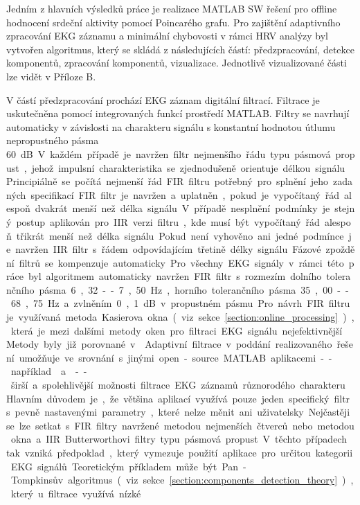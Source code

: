 Jedním z hlavních výsledků práce je realizace MATLAB SW řešení pro offline
hodnocení srdeční aktivity pomocí Poincarého grafu. Pro zajištění adaptivního
zpracování EKG záznamu a minimální chybovosti v rámci HRV analýzy byl vytvořen
algoritmus, který se skládá z následujících částí: předzpracování, detekce
komponentů, zpracování komponentů, vizualizace. Jednotlivě vizualizované části
lze vidět v Příloze B.

V částí předzpracování prochází EKG záznam digitální filtrací. Filtrace je
uskutečněna pomocí integrovaných funkcí prostředí MATLAB. Filtry se
navrhují automaticky v závislosti na charakteru signálu s konstantní hodnotou
útlumu nepropustného pásma 60~\si\dB. V každém případě je navržen filtr
nejmenšího řádu typu pásmová propust, jehož impulsní charakteristika se
zjednodušeně orientuje délkou signálu. Principiálně se počítá nejmenší řád FIR
filtru potřebný pro splnění jeho zadaných specifikací. FIR filtr je navržen a
uplatněn, pokud je vypočítaný řád alespoň dvakrát menší než délka signálu. V
případě nesplnění podmínky je stejný postup aplikován pro IIR verzi filtru, kde
musí být vypočítaný řád alespoň třikrát menší než délka signálu. Pokud není
vyhověno ani jedné podmínce je navržen IIR filtr s řádem odpovídajícím třetině
délky signálu. Fázové zpoždění filtrů se kompenzuje automaticky. Pro všechny EKG
signály v rámci této práce byl algoritmem automaticky navržen FIR filtr s
rozmezím dolního tolerančního pásma 6,32--7,50~\si\Hz, horního tolerančního
pásma 35,00--68,75~\si\Hz~a zvlněním 0,1~\si\dB~v propustném pásmu. Pro návrh
FIR filtru je využívaná metoda Kasierova okna (viz
sekce~\ref{section:online_processing}), která je mezi dalšími metody oken pro
filtraci EKG signálu nejefektivnější. Metody byly již porovnané v
\cite{Kumar2014,Lakhwani2013,Yadav2011}. Adaptivní filtrace v poddání
realizovaného řešení umožňuje ve srovnání s jinými open-source MATLAB
aplikacemi -- například~\cite{ecgkit}~a~\cite{Sedghamiz2018} -- širší a
spolehlivější možnosti filtrace EKG záznamů různorodého charakteru. Hlavním
důvodem je, že většina aplikací využívá pouze jeden specifický filtr s pevně
nastavenými parametry, které nelze měnit ani uživatelsky. Nejčastěji se lze
setkat s FIR filtry navržené metodou nejmenších čtverců nebo metodou okna a IIR
Butterworthovi filtry typu pásmová propust. V těchto případech tak vzniká
předpoklad, který vymezuje použití aplikace pro určitou kategorii EKG signálů.
Teoretickým příkladem může být Pan-Tompkinsův algoritmus (viz
sekce~\ref{section:components_detection_theory}), který u filtrace využívá nízké
